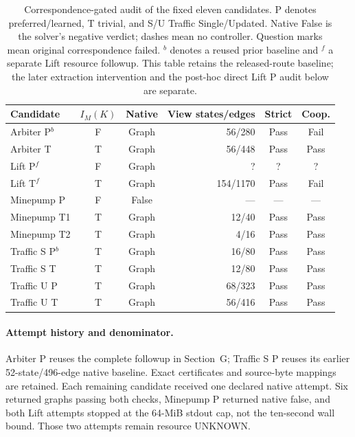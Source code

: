 \begin{table}[htbp]
\centering\small
\caption{Correspondence-gated audit of the fixed eleven candidates. P denotes preferred/learned, T trivial,
and S/U Traffic Single/Updated. Native False is the solver's negative
verdict; dashes mean no controller. Question marks mean original
correspondence failed. $^{b}$ denotes a reused prior baseline and
$^{f}$ a separate Lift resource followup. This table retains the released-route baseline; the later extraction intervention and the post-hoc direct Lift P audit below are separate.}
\label{tab:supp-repair-eleven}
\begin{tabular}{@{}lccrcc@{}}
\toprule
Candidate & $I_M(K)$ & Native & View states/edges & Strict & Coop.\\
\midrule
Arbiter P$^{b}$ & F & Graph & 56/280 & Pass & Fail\\
Arbiter T & T & Graph & 56/448 & Pass & Pass\\
Lift P$^{f}$ & F & Graph & ? & ? & ?\\
Lift T$^{f}$ & T & Graph & 154/1170 & Pass & Fail\\
Minepump P & F & False & --- & --- & ---\\
Minepump T1 & T & Graph & 12/40 & Pass & Pass\\
Minepump T2 & T & Graph & 4/16 & Pass & Pass\\
Traffic S P$^{b}$ & T & Graph & 16/80 & Pass & Pass\\
Traffic S T & T & Graph & 12/80 & Pass & Pass\\
Traffic U P & T & Graph & 68/323 & Pass & Pass\\
Traffic U T & T & Graph & 56/416 & Pass & Pass\\
\bottomrule
\end{tabular}
\end{table}

\paragraph{Attempt history and denominator.}
Arbiter P reuses the complete followup in Section~G; Traffic S P reuses
its earlier 52-state/496-edge native baseline. Exact certificates and
source-byte mappings are retained. Each remaining candidate received
one declared native attempt. Six returned graphs passing both checks,
Minepump P returned native false, and both Lift attempts stopped at the
64-MiB stdout cap, not the ten-second wall bound. Those two attempts
remain resource UNKNOWN.

